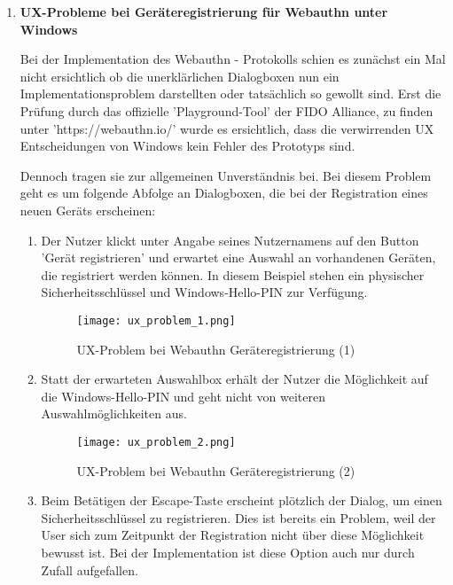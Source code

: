 \begin{enumerate}
\item \textbf{UX-Probleme bei Geräteregistrierung für Webauthn unter Windows}

Bei der Implementation des Webauthn - Protokolls schien es zunächst ein Mal nicht ersichtlich ob die unerklärlichen Dialogboxen nun ein Implementationsproblem darstellten oder tatsächlich so gewollt sind. Erst die Prüfung durch das offizielle 'Playground-Tool' der FIDO Alliance, zu finden unter 'https://webauthn.io/' wurde es ersichtlich, dass die verwirrenden UX Entscheidungen von Windows kein Fehler des Prototyps sind. 
\newpage

Dennoch tragen sie zur allgemeinen Unverständnis bei.
Bei diesem Problem geht es um folgende Abfolge an Dialogboxen, die bei der Registration eines neuen Geräts erscheinen:

\begin{enumerate}
\item Der Nutzer klickt unter Angabe seines Nutzernamens auf den Button 'Gerät registrieren' und erwartet eine Auswahl an vorhandenen Geräten, die registriert werden können. In diesem Beispiel stehen ein physischer Sicherheitsschlüssel und Windows-Hello-PIN zur Verfügung.

\begin{figure}[ht]
	\centering
	\texttt{[image: ux\_problem\_1.png]}
	\caption[UX-Problem bei Webauthn Geräteregistrierung (1)]{UX-Problem bei Webauthn Geräteregistrierung (1)}
	\label{fig:ux_problem_1}
\end{figure}

\item Statt der erwarteten Auswahlbox erhält der Nutzer die Möglichkeit auf die Windows-Hello-PIN und geht nicht von weiteren Auswahlmöglichkeiten aus.

\begin{figure}[ht]
	\centering
	\texttt{[image: ux\_problem\_2.png]}
	\caption[UX-Problem bei Webauthn Geräteregistrierung (2)]{UX-Problem bei Webauthn Geräteregistrierung (2)}
	\label{fig:ux_problem_2}
\end{figure}
\newpage

\item Beim Betätigen der Escape-Taste erscheint plötzlich der Dialog, um einen Sicherheitsschlüssel zu registrieren. Dies ist bereits ein Problem, weil der User sich zum Zeitpunkt der Registration nicht über diese Möglichkeit bewusst ist. Bei der Implementation ist diese Option auch nur durch Zufall aufgefallen.


\end{enumerate}
\end{enumerate}
